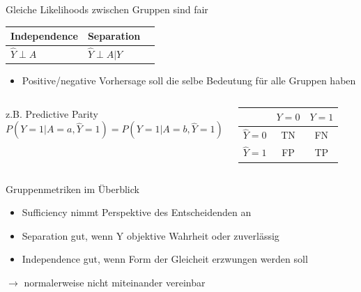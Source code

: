 \documentclass[aspectratio=169]{beamer}
\begin{document}
\begin{frame}[t]{Gleiche Likelihoods zwischen Gruppen sind fair}
	\vspace*{0.3cm} %
	\begin{table}
		\begin{tabular}{lll}
			\toprule
			Independence & Separation & \color{orange}{Sufficiency} \\
			\midrule
			$\hat{Y} \perp A$ & $\hat{Y} \perp A | Y$ & \color{orange}{$Y \perp A | \hat{Y}$}\\
			\bottomrule
		\end{tabular}
	\end{table}
	\begin{itemize}
		\item Positive/negative Vorhersage soll die selbe Bedeutung für alle Gruppen haben
	\end{itemize}
	\begin{columns}
		\centering
		z.B. Predictive Parity \cite{verma2018}\\
		\centering
		$$P(Y = 1 | A = a, \hat{Y} = 1) = P(Y = 1 | A = b, \hat{Y} = 1)$$
		\begin{center}
			\renewcommand{\arraystretch}{1.5}  %
			\begin{tabular}{c|c|c|}
				& \(Y = 0\) & \(Y = 1\) \\
				\hline
				\color{orange}\(\hat{Y} = 0\) & TN & FN \\
				\hline
				\color{orange}\(\hat{Y} = 1\) & FP & TP \\
				\hline
			\end{tabular}
		\end{center}
	\end{columns}
\end{frame}

\begin{frame}{Gruppenmetriken im Überblick}
	\begin{itemize}
		\item Sufficiency nimmt Perspektive des Entscheidenden an
		\item Separation gut, wenn Y objektive Wahrheit oder zuverlässig
		\item Independence gut, wenn Form der Gleicheit erzwungen werden soll \cite{castelnovo2022}
	\end{itemize}
	$\rightarrow$ normalerweise nicht miteinander vereinbar
\end{frame}
\end{document}
